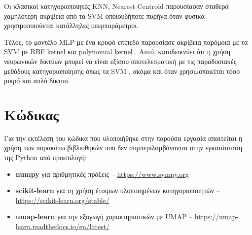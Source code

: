 \documentclass[a4paper,12pt]{article}
\newcommand{\lt}{\latintext}
\newcommand{\gt}{\greektext}
\begin{document}
Οι κλασικοί κατηγοριοποιητές \lt KNN, Nearest Centroid \gt παρουσίασαν σταθερά χαμηλότερη ακρίβεια από τα \lt SVM \gt οποιουδήποτε πυρήνα όταν φυσικά χρησιμοποιούνται κατάλληλες υπερπαράμετροι.

Τέλος, το μοντέλο \lt MLP \gt με ένα κρυφό επίπεδο παρουσίασε ακρίβεια παρόμοια με τα \lt SVM \gt με \lt RBF kernel \gt και \lt polynomial kernel \gt. 
Αυτό, καταδεικνύει ότι η χρήση νευρωνικών δικτύων μπορεί να είναι εξίσου αποτελεσματική με τις παραδοσιακές μεθόδους κατηγοριοποίησης όπως τα \lt SVM \gt, ακόμα και όταν χρησιμοποιείται τόσο μικρό και απλό δίκτυο.



\section{Κώδικας}

Για την εκτέλεση του κώδικα που υλοποιήθηκε στην παρούσα εργασία απαιτείται 
η χρήση των παρακάτω βιβλιοθηκών που δεν συμπεριλαμβάνονται στην εγκατάσταση της \lt Python \gt από προεπιλογή:
\begin{itemize}
\item \lt \textbf{numpy} \gt για αριθμητικές πράξεις -- \lt \href{https://www.sympy.org/}{https://www.sympy.org} \gt
\item \lt \textbf{scikit-learn} \gt για τη χρήση έτοιμων υλοποιημένων κατηγοριοποιητών -- \\ \lt \href{https://scikit-learn.org/stable/}{https://scikit-learn.org/stable/} \gt
\item \lt \textbf{umap-learn} \gt για την εξαγωγή χαρακτηριστικών με \lt UMAP \gt -- \lt \href{https://umap-learn.readthedocs.io/en/latest/}{https://umap-learn.readthedocs.io/en/latest/} \gt
\end{itemize}
\end{document}
